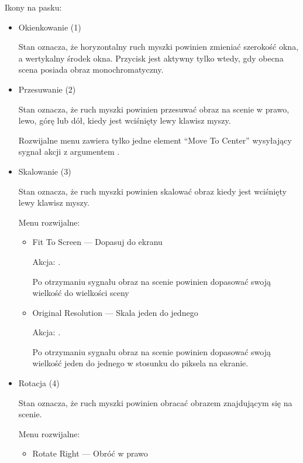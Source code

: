 Ikony na pasku:
\begin{itemize}
    \item Okienkowanie (1)

          Stan  oznacza, że horyzontalny ruch myszki powinien zmieniać szerokość okna, a wertykalny środek okna.
          Przycisk jest aktywny tylko wtedy, gdy obecna scena posiada obraz monochromatyczny.

    \item Przesuwanie (2)

          Stan  oznacza, że ruch myszki powinien przesuwać obraz na scenie w prawo, lewo, górę lub dół, kiedy jest wciśnięty lewy klawisz myszy.

          Rozwijalne menu zawiera tylko jedne element \enquote{Move To Center} wysyłający sygnał akcji z argumentem .

    \item Skalowanie (3)

          Stan  oznacza, że ruch myszki powinien skalować obraz kiedy jest wciśnięty lewy klawisz myszy.

          Menu rozwijalne:
          \begin{itemize}
              \item Fit To Screen --- Dopasuj do ekranu

                    Akcja: .

                    Po otrzymaniu sygnału obraz na scenie powinien dopasować swoją wielkość do wielkości sceny

              \item Original Resolution --- Skala jeden do jednego

                    Akcja: .

                    Po otrzymaniu sygnału obraz na scenie powinien dopasować swoją wielkość jeden do jednego w stosunku do piksela na ekranie.

          \end{itemize}

    \item Rotacja (4)

          Stan  oznacza, że ruch myszki powinien obracać obrazem znajdującym się na scenie.

          Menu rozwijalne:
          \begin{itemize}
              \item Rotate Right --- Obróć w prawo


\end{itemize}
\end{itemize}
